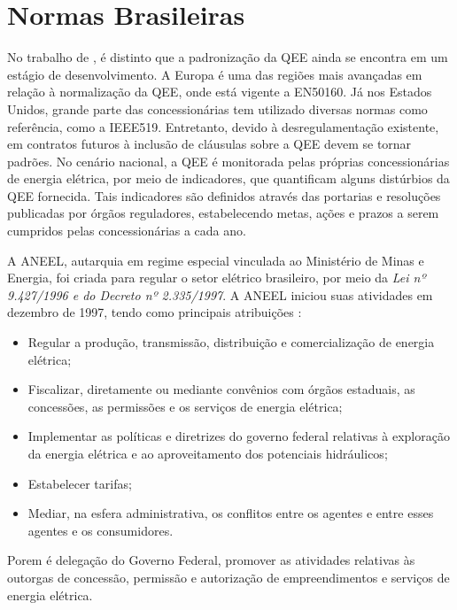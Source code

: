 \section{Normas Brasileiras}\label{qeeNormas}
\par
No trabalho de \cite{JUN09}, é distinto que a padronização da \ac{QEE} ainda se encontra em um estágio de desenvolvimento. A Europa é uma das regiões mais avançadas em relação à normalização da \ac{QEE}, onde está vigente a EN50160. Já nos Estados Unidos, grande parte das concessionárias tem utilizado diversas normas como referência, como a IEEE519. Entretanto, devido à desregulamentação existente, em contratos futuros à inclusão de cláusulas sobre a QEE devem se tornar padrões.
No cenário nacional, a QEE é monitorada pelas próprias concessionárias de energia elétrica, por meio de indicadores, que quantificam alguns distúrbios da QEE fornecida. Tais indicadores são definidos através das portarias e resoluções publicadas por órgãos reguladores, estabelecendo metas, ações e prazos a serem cumpridos pelas concessionárias a cada ano.
\par
A ANEEL, autarquia em regime especial vinculada ao Ministério de Minas e Energia, foi criada para regular o setor elétrico brasileiro, por meio da \emph{Lei nº 9.427/1996 e do Decreto nº 2.335/1997}. A \ac{ANEEL} iniciou suas atividades em dezembro de 1997, tendo como principais atribuições \cite{ANEEL}:
\begin{itemize}
\item Regular a produção, transmissão, distribuição e comercialização de energia elétrica;
\item Fiscalizar, diretamente ou mediante convênios com órgãos estaduais, as concessões, as permissões e os serviços de energia elétrica;
\item Implementar as políticas e diretrizes do governo federal relativas à exploração da energia elétrica e ao aproveitamento dos potenciais hidráulicos;
\item Estabelecer tarifas;
\item Mediar, na esfera administrativa, os conflitos entre os agentes e entre esses agentes e os consumidores.
\end{itemize}
\par
Porem é delegação do Governo Federal, promover as atividades relativas às outorgas de concessão, permissão e autorização de empreendimentos e serviços de energia elétrica.

